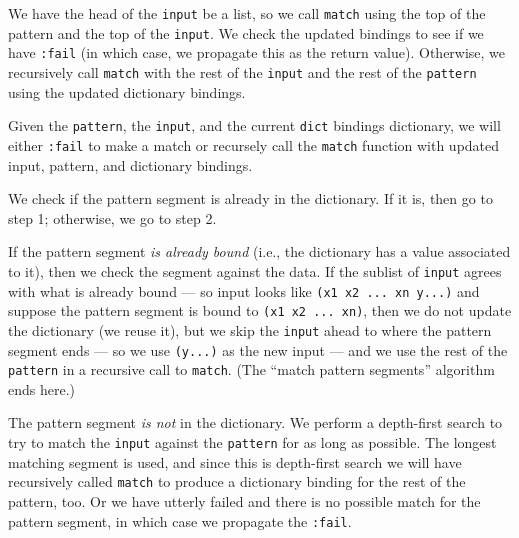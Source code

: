  We have the head of the \lstinline[language=lisp]{input} be
a list, so we call \lstinline[language=lisp]{match} using the top of the
pattern and the top of the \lstinline[language=lisp]{input}. We check
the updated bindings to see if we have \lstinline[language=lisp]{:fail}
(in which case, we propagate this as the return value). Otherwise, we
recursively call \lstinline[language=lisp]{match}
with the rest of the \lstinline[language=lisp]{input} and the
rest of the \lstinline[language=lisp]{pattern} using the updated
dictionary bindings.\quad\qedsymbol

Given the \lstinline[language=lisp]{pattern},
the \lstinline[language=lisp]{input}, and the current
\lstinline[language=lisp]{dict} bindings dictionary, we will either
\lstinline[language=lisp]{:fail} to make a match or recursely call the
\lstinline[language=lisp]{match} function with updated input, pattern,
and dictionary bindings.

We check if the pattern segment is already in the dictionary. If it is,
then go to step 1; otherwise, we go to step 2.

If the pattern segment \emph{is already bound} (i.e., the dictionary has
a value associated to it), then we check the segment against the data.
If the sublist of \lstinline[language=lisp]{input} agrees with what is
already bound --- so input looks like \lstinline[language=lisp]{(x1 x2 ... xn y...)}
and suppose the pattern segment is bound to \lstinline[language=lisp]{(x1 x2 ... xn)}, then we
do not update the dictionary (we reuse it),
but we skip the \lstinline[language=lisp]{input} ahead to where the
pattern segment ends --- so we use \lstinline[language=lisp]{(y...)} as
the new input --- and we use the rest of the
\lstinline[language=lisp]{pattern} in a recursive call to
\lstinline[language=lisp]{match}. (The ``match pattern segments''
algorithm ends here.)

The pattern segment \emph{is not} in the dictionary. We perform a
depth-first search to try to match the \lstinline[language=lisp]{input}
against the \lstinline[language=lisp]{pattern} for as long as possible.
The longest matching segment is used, and since this is depth-first
search we will have recursively called \lstinline[language=lisp]{match}
to produce a dictionary binding for the rest of the pattern, too.
Or we have utterly failed and there is no possible match for the pattern
segment, in which case we propagate the \lstinline[language=lisp]{:fail}.\quad\qedsymbol


